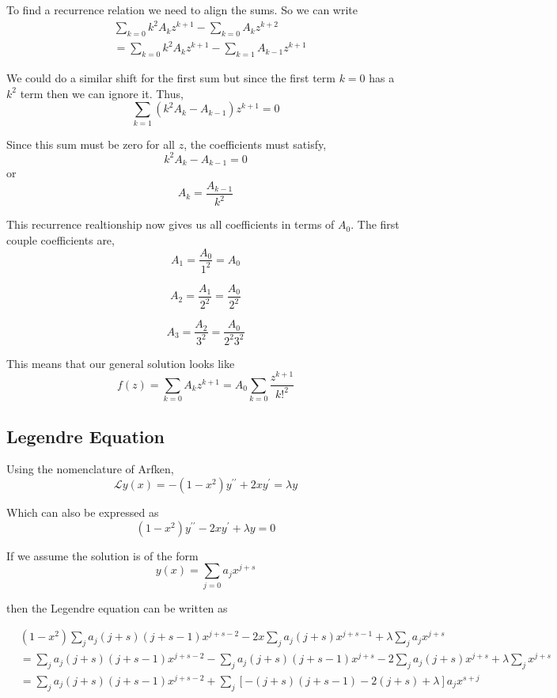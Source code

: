 To find a recurrence relation we need to align the sums.
So we can write
\begin{align*}
& \sum_{k=0} k^2 A_k z^{k+1} - \sum_{k=0} A_k z^{k+2} \\
&= \sum_{k=0} k^2 A_k z^{k+1} - \sum_{k=1} A_{k-1} z^{k+1}
\end{align*}

We could do a similar shift for the first sum but since the first term $k=0$ has a $k^2$ term then we can ignore it.
Thus,
$$
\sum_{k=1} \left( k^2 A_k - A_{k-1} \right) z^{k+1} = 0
$$

Since this sum must be zero for all $z$, the coefficients must satisfy,
$$
k^2 A_k - A_{k-1} = 0
$$
or
$$
A_k = \frac{ A_{k-1} }{k^2} 
$$

This recurrence realtionship now gives us all coefficients in terms of $A_0$.
The first couple coefficients are,
$$
A_1 = \frac{ A_0 }{1^2} = A_0
$$

$$
A_2 = \frac{ A_1 }{2^2} = \frac{ A_0 }{2^2}
$$

$$
A_3 = \frac{ A_2 }{3^2} = \frac{ A_0 }{2^2 3^2}
$$

This means that our general solution looks like
$$
f(z) = \sum_{k=0} A_k z^{k+1}
= A_0 \sum_{k=0} \frac{ z^{k+1} }{k!^2}
$$




\subsection{Legendre Equation}

Using the nomenclature of Arfken,
$$
\mathcal{L} y(x) =
-(1-x^2) y^{\prime\prime} + 2x y^\prime = \lambda y
$$

Which can also be expressed as
$$
(1-x^2) y^{\prime\prime} - 2x y^\prime + \lambda y = 0
$$

If we assume the solution is of the form
$$
y(x) =
\sum_{j=0} a_j x^{j+s}
$$

then the Legendre equation can be written as

\begin{align*}
& (1-x^2) \sum_{j} a_j (j+s)(j+s-1) x^{j+s-2}
    - 2x \sum_{j} a_j (j+s) x^{j+s-1}
    + \lambda \sum_{j} a_j x^{j+s} \\
&= \sum_{j} a_j (j+s)(j+s-1) x^{j+s-2}
    - \sum_{j} a_j (j+s)(j+s-1) x^{j+s}
    -2 \sum_{j} a_j (j+s) x^{j+s}
    + \lambda \sum_{j} x^{j+s} \\
&= \sum_{j} a_j (j+s)(j+s-1) x^{j+s-2}
    + \sum_j \left[ -(j+s)(j+s-1) -2(j+s) + \lambda \right] a_j x^{s+j}
\end{align*}

